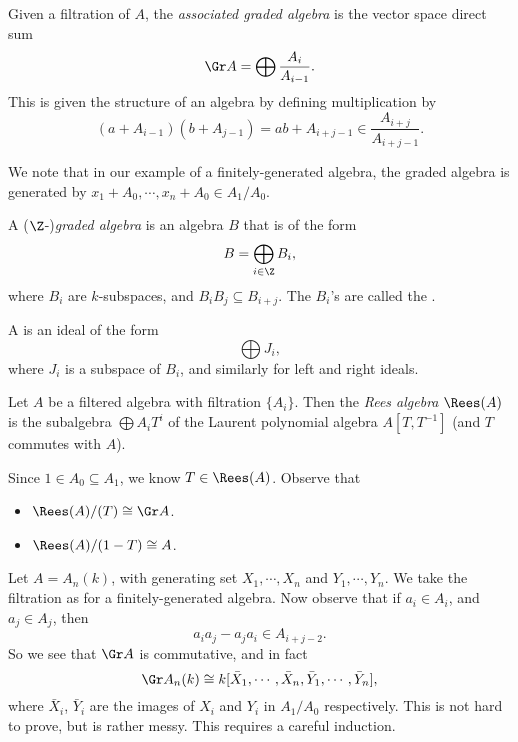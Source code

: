 \documentclass[a4paper]{article}
\begin{document}
\begin{defi}
  Given a filtration of $A$, the \emph{associated graded algebra} is the vector space direct sum
  \[
    \Gr A = \bigoplus \frac{A_i}{A_{i - 1}}.
  \]
  This is given the structure of an algebra by defining multiplication by
  \[
    (a + A_{i - 1}) (b + A_{j - 1}) = ab + A_{i + j - 1} \in \frac{A_{i + j}}{A_{i + j - 1}}.
  \]
\end{defi}
We note that in our example of a finitely-generated algebra, the graded algebra is generated by $x_1 + A_0, \cdots, x_n + A_0 \in A_1/A_0$.

\begin{defi}
  A ($\Z$-)\emph{graded algebra} is an algebra $B$ that is of the form
  \[
    B = \bigoplus_{i \in \Z} B_i,
  \]
  where $B_i$ are $k$-subspaces, and $B_i B_j \subseteq B_{i + j}$. The $B_i$'s are called the .

  A  is an ideal of the form
  \[
    \bigoplus J_i,
  \]
  where $J_i$ is a subspace of $B_i$, and similarly for left and right ideals.
\end{defi}

\begin{defi}
  Let $A$ be a filtered algebra with filtration $\{A_i\}$. Then the \emph{Rees algebra} $\Rees(A)$ is the subalgebra $\bigoplus A_i T^i$ of the Laurent polynomial algebra $A[T, T^{-1}]$ (and $T$ commutes with $A$).
\end{defi}

Since $1 \in A_0 \subseteq A_1$, we know $T \in \Rees(A)$. Observe that
\begin{itemize}
  \item $\Rees(A)/(T) \cong \Gr A$.
  \item $\Rees(A)/(1 - T) \cong A$.
\end{itemize}

\begin{eg}
  Let $A = A_n(k)$, with generating set $X_1, \cdots, X_n$ and $Y_1, \cdots, Y_n$. We take the filtration as for a finitely-generated algebra. Now observe that if $a_i \in A_i$, and $a_j \in A_j$, then 
  \[
    a_i a_j - a_j a_i \in A_{i + j - 2}.
  \]
  So we see that $\Gr A$ is commutative, and in fact
  \[
    \Gr A_n(k) \cong k[\bar{X}_1, \cdots, \bar{X}_n, \bar{Y}_1, \cdots, \bar{Y}_n],
  \]
  where $\bar{X}_i$, $\bar{Y}_i$ are the images of $X_i$ and $Y_i$ in $A_1/A_0$ respectively. This is not hard to prove, but is rather messy. This requires a careful induction.
\end{eg}
\end{document}
